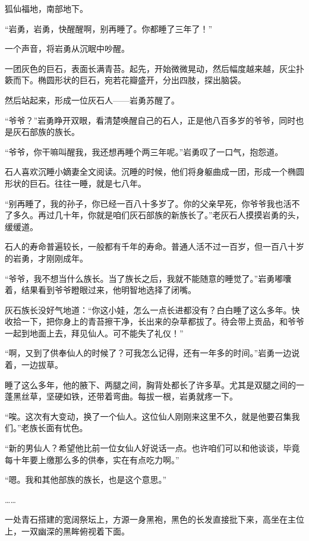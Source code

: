 
\begin{this_body}



狐仙福地，南部地下。

“岩勇，岩勇，快醒醒啊，别再睡了。你都睡了三年了！”

一个声音，将岩勇从沉眠中吵醒。

一团灰色的巨石，表面长满青苔。起先，开始微微晃动，然后幅度越来越，灰尘扑簌而下。椭圆形状的巨石，宛若花瓣盛开，分出四肢，探出脑袋。

然后站起来，形成一位灰石人——岩勇苏醒了。

“爷爷？”岩勇睁开双眼，看清楚唤醒自己的石人，正是他八百多岁的爷爷，同时也是灰石部族的族长。

“爷爷，你干嘛叫醒我，我还想再睡个两三年呢。”岩勇叹了一口气，抱怨道。

石人喜欢沉睡小嫡妻全文阅读。沉睡的时候，他们将身躯曲成一团，形成一个椭圆形状的巨石。往往一睡，就是七八年。

“别再睡了，我的孙子，你已经一百八十多岁了。你的父亲早死，你爷爷我也活不了多久。再过几十年，你就是咱们灰石部族的新族长了。”老灰石人摸摸岩勇的头，缓缓道。

石人的寿命普遍较长，一般都有千年的寿命。普通人活不过一百岁，但一百八十岁的岩勇，才刚刚成年。

“爷爷，我不想当什么族长。当了族长之后，我就不能随意的睡觉了。”岩勇嘟囔着，结果看到爷爷瞪眼过来，他明智地选择了闭嘴。

灰石族长没好气地道：“你这小娃，怎么一点长进都没有？白白睡了这么多年。快收拾一下，把你身上的青苔擦干净，长出来的杂草都拔了。待会带上贡品，和爷爷一起到地面上去，拜见仙人。可不能失了礼仪！”

“啊，又到了供奉仙人的时候了？可我怎么记得，还有一年多的时间。”岩勇一边说着，一边拔草。

睡了这么多年，他的腋下、两腿之间，胸背处都长了许多草。尤其是双腿之间的一蓬黑丝草，坚硬如铁，还带着弯曲。每拔一根，岩勇就疼一下。

“唉。这次有大变动，换了一个仙人。这位仙人刚刚来这里不久，就是他要召集我们。”老族长面有忧色。

“新的男仙人？希望他比前一位女仙人好说话一点。也许咱们可以和他谈谈，毕竟每十年要上缴那么多的供奉，实在有点吃力啊。”

“嗯。我和其他部族的族长，也是这个意思。”

……

一处青石搭建的宽阔祭坛上，方源一身黑袍，黑色的长发直接批下来，高坐在主位上，一双幽深的黑眸俯视着下面。


\end{this_body}
